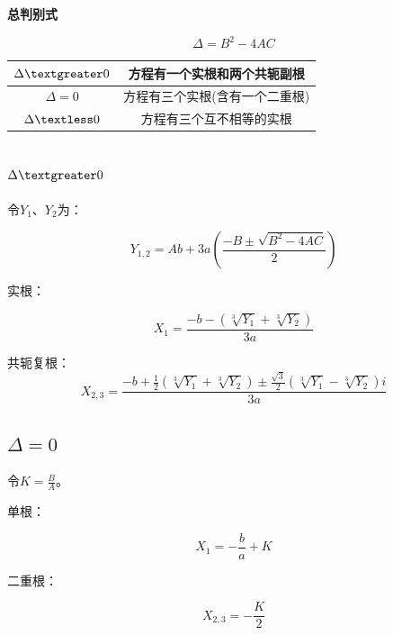 \documentclass{ctexart}
\begin{document}
\textbf{总判别式}

\begin{equation}
    \Delta=B^2-4AC
\end{equation}

\begin{table}[]
    \centering
    \begin{tabular}{|c|c|}
        \hline
        $\Delta \textgreater 0$ & 方程有一个实根和两个共轭副根 \\
        \hline
        $\Delta = 0$ & 方程有三个实根(含有一个二重根)\\
        \hline
        $\Delta \textless 0$ & 方程有三个互不相等的实根 \\ 
        \hline
    \end{tabular}
\end{table}

\subsection{$\Delta \textgreater 0$}

令$Y_1$、$Y_2$为：

\begin{equation}
    Y_{1,2}=Ab+3a(\frac{-B\pm \sqrt{B^2-4AC}}{2})
\end{equation}

实根：

\begin{equation}
    X_1=\frac{-b-(\sqrt[3]{Y_1}+\sqrt[3]{Y_2})}{3a}
\end{equation}

共轭复根：
\begin{equation}
    X_{2,3}=\frac{-b+\frac{1}{2}(\sqrt[3]{Y_1}+\sqrt[3]{Y_2})\pm \frac{\sqrt{3}}{2}(\sqrt[3]{Y_1}-\sqrt[3]{Y_2})i}{3a}
\end{equation}

\subsection{$\Delta = 0$}

令$K=\frac{B}{A}$。

单根：

\begin{equation}
    X_1=-\frac{b}{a}+K
\end{equation}

二重根：

\begin{equation}
    X_{2,3}=-\frac{K}{2}
\end{equation}
\end{document}
